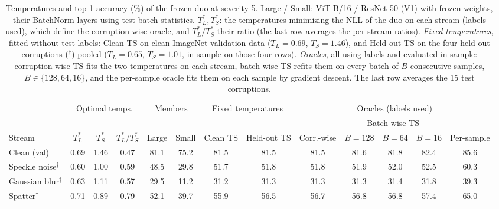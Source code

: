 \begin{table}[t]
    \centering
    \small
    \setlength{\tabcolsep}{4.5pt}
    \caption{Temperatures and top-1 accuracy (\%) of the frozen duo at severity 5. Large / Small: ViT-B/16 / ResNet-50 (V1) with frozen weights, their BatchNorm layers using test-batch statistics. $T_L^*, T_S^*$: the temperatures minimizing the NLL of the duo on each stream (labels used), which define the corruption-wise oracle, and $T_L^*/T_S^*$ their ratio (the last row averages the per-stream ratios). \emph{Fixed temperatures}, fitted without test labels: Clean TS on clean ImageNet validation data ($T_L = 0.69$, $T_S = 1.46$), and Held-out TS on the four held-out corruptions ($^\dagger$) pooled ($T_L = 0.65$, $T_S = 1.01$, in-sample on those four rows). \emph{Oracles}, all using labels and evaluated in-sample: corruption-wise TS fits the two temperatures on each stream, batch-wise TS refits them on every batch of $B$ consecutive samples, $B \in \{128, 64, 16\}$, and the per-sample oracle fits them on each sample by gradient descent. The last row averages the 15 test corruptions.}
    \label{tab:temperatures:frozen_bn__vitb16_rn50v1}
    \label{tab:oracles:frozen_bn__vitb16_rn50v1}
    \begin{tabular}{l|ccc|cc|cc|ccccc}
        \toprule
        & \multicolumn{3}{c|}{Optimal temps.} & \multicolumn{2}{c|}{Members} & \multicolumn{2}{c|}{Fixed temperatures} & \multicolumn{5}{c}{Oracles (labels used)} \\
         &  &  &  &  &  &  &  &  & \multicolumn{3}{c}{Batch-wise TS} &  \\
        \cmidrule(lr){10-12}
        Stream & $T_L^*$ & $T_S^*$ & $T_L^*/T_S^*$ & Large & Small & Clean TS & Held-out TS & Corr.-wise & $B{=}128$ & $B{=}64$ & $B{=}16$ & Per-sample \\
        \midrule
        Clean (val) & 0.69 & 1.46 & 0.47 & 81.1 & 75.2 & 81.5 & 81.5 & 81.5 & 81.6 & 81.8 & 82.4 & 85.6 \\
        \midrule
        Speckle noise$^\dagger$ & 0.60 & 1.00 & 0.59 & 48.5 & 29.8 & 51.7 & 51.8 & 51.8 & 51.9 & 52.0 & 52.5 & 60.3 \\
        Gaussian blur$^\dagger$ & 0.63 & 1.11 & 0.57 & 29.5 & 11.2 & 31.2 & 31.3 & 31.3 & 31.3 & 31.4 & 31.8 & 39.3 \\
        Spatter$^\dagger$ & 0.71 & 0.89 & 0.79 & 52.1 & 39.7 & 55.9 & 56.5 & 56.7 & 56.8 & 56.8 & 57.4 & 65.0 \\

\end{tabular}
\end{table}
